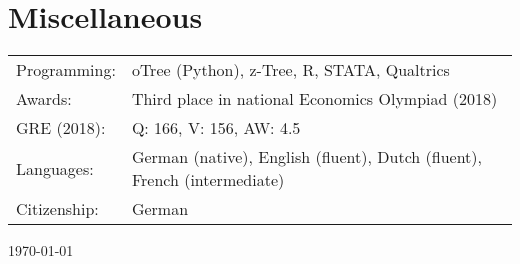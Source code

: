 \documentclass[11pt]{article}
\begin{document}
\section{Miscellaneous}
\noindent\begin{tabular}{L{3cm}L{13cm}}
Programming: & oTree (Python), z-Tree, R, STATA, Qualtrics \\
\rule{0pt}{3ex}Awards: & Third place in national Economics Olympiad (2018) \\
\rule{0pt}{3ex}GRE (2018): & Q: 166, V: 156, AW: 4.5 \\
\rule{0pt}{3ex}Languages: & German (native), English (fluent), Dutch (fluent), French (intermediate) \\
\rule{0pt}{3ex}Citizenship: & German
\end{tabular}

\vspace*{1cm}

\hspace*{\fill} \monthyeardate\today
\end{document}
